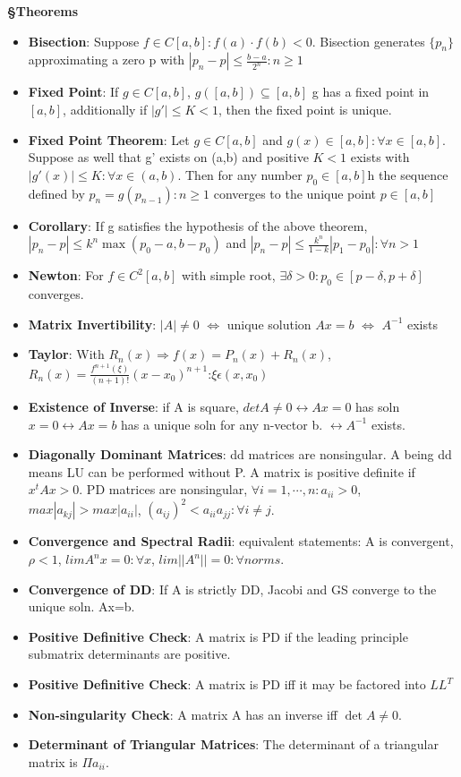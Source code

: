 \documentclass{article}
\begin{document}
\begin{tcolorbox}[colframe=black,colback=white,boxrule=0.3pt,arc=1pt,
left=0pt,right=0pt,top=0pt,bottom=0pt]
\begin{minipage}[t]{0.49\textwidth}
\textbf{\S Theorems}
\begin{itemize}
\item \textbf{Bisection}: Suppose $f\in C[a,b]:f(a)\cdot f(b) <0$. Bisection generates $\{p_n\}$ approximating a zero p with $|p_n-p|\le \frac{b-a}{2^n}:n\ge 1$
\item \textbf{Fixed Point}: If $g\in C[a,b]$, $g([a,b])\subseteq[a,b]$ g has a fixed point in $[a,b]$, additionally if $|g'|\leq K<1$, then the fixed point is unique.
\item \textbf{Fixed Point Theorem}: Let $g\in C[a,b]$ and $g(x)\in[a,b]:\forall x\in[a,b]$. Suppose as well that g' exists on (a,b) and positive $K<1$ exists with $|g'(x)|\le K:\forall x \in (a,b)$. Then for any number $p_0 \in [a,b]$h the sequence defined by $p_n=g(p_{n-1}):n\ge1$ converges to the unique point $p\in[a,b]$
\item \textbf {Corollary}: If g satisfies the hypothesis of the above theorem, $|p_n-p| \le k^n\max(p_0-a,b-p_0)$ and $|p_n-p|\le\frac{k^n}{1-k}|p_1-p_0|:\forall n>1$
\item \textbf{Newton}: For $f\in C^2[a,b]$ with simple root, $\exists\delta>0:p_0\in[p-\delta,p+\delta]$ converges.
\item \textbf{Matrix Invertibility}: $|A|\neq0$ $\Leftrightarrow$ unique solution $Ax=b$ $\Leftrightarrow$ $A^{-1}$ exists
\item \textbf{Taylor}: With $R_n(x)\Rightarrow f(x)=P_n(x)+R_n(x)$, $R_n(x)=\frac{f^{n+1}(\xi)}{(n+1)!}(x-x_0)^{n+1}$:$\xi \epsilon (x, x_0)$
\item \textbf{Existence of Inverse}: if A is square, $detA\ne 0 \leftrightarrow Ax=0$ has soln $x=0 \leftrightarrow Ax=b$ has a unique soln for any n-vector b. $\leftrightarrow A^{-1}$ exists.
\item \textbf{Diagonally Dominant Matrices}: dd matrices are nonsingular. A being dd means LU can be performed without P. A matrix is positive definite if $x^tAx>0$. PD matrices are nonsingular, $\forall i=1,\cdots,n: a_{ii} > 0$, $max|a_{kj}| > max|a_{ii}|$, $(a_{ij})^2<a_{ii}a_{jj}:\forall i\neq j$.
\item \textbf{Convergence and Spectral Radii}: equivalent statements: A is convergent, $\rho <1$, $lim A^nx=0:\forall x$, $lim ||A^n|| = 0 :\forall norms$.
\item \textbf{Convergence of DD}: If A is strictly DD, Jacobi and GS converge to the unique soln. Ax=b.
\item \textbf{Positive Definitive Check}: A matrix is PD if the leading principle submatrix determinants are positive.
\item \textbf{Positive Definitive Check}: A matrix is PD iff it may be factored into $LL^T$
\item \textbf{Non-singularity Check}: A matrix A has an inverse iff $\det A \ne 0$.
\item \textbf{Determinant of Triangular Matrices}: The determinant of a triangular matrix is $\Pi a_{ii}$.
\end{itemize}


\end{minipage}
\end{tcolorbox}
\end{document}
